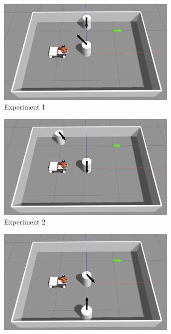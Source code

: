 \begin{figure}[H]
    \centering
    \begin{subfigure}[b]{0.50\linewidth}
        \centering
        \includegraphics[width=0.95\textwidth]{images/test_case_2/exp1.png}
        \caption{Experiment 1}
    \end{subfigure}%
    \begin{subfigure}[b]{0.50\linewidth}
        \centering
        \includegraphics[width=0.95\textwidth]{images/test_case_2/exp2.png}
        \caption{Experiment 2}
    \end{subfigure}
    \begin{subfigure}[b]{0.50\linewidth}
        \centering
        \includegraphics[width=0.95\textwidth]{images/test_case_2/exp3.png}

\end{subfigure}
\end{figure}
